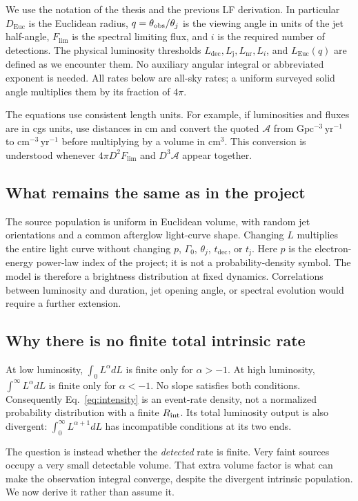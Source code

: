 \documentclass[11pt,a4paper]{article}
\newcommand{\Euc}{\mathrm{Euc}}
\newcommand{\Flim}{F_{\mathrm{lim}}}
\newcommand{\Ldec}{L_{\mathrm{dec}}}
\newcommand{\Lj}{L_{\mathrm j}}
\newcommand{\Lnr}{L_{\mathrm{nr}}}
\newcommand{\tdec}{t_{\mathrm{dec}}}
\newcommand{\tj}{t_{\mathrm j}}
\begin{document}
We use the notation of the thesis and the previous LF derivation. In
particular $D_\Euc$ is the Euclidean radius, $q=\theta_{\rm obs}/\theta_j$
is the viewing angle in units of the jet half-angle, $\Flim$ is the spectral
limiting flux, and $i$ is the required number of detections. The physical
luminosity thresholds $\Ldec,\Lj,\Lnr,L_i$, and $L_\Euc(q)$ are defined as
we encounter them. No auxiliary angular integral or abbreviated exponent is
needed. All rates below are all-sky rates; a uniform surveyed solid angle
multiplies them by its fraction of $4\pi$.

The equations use consistent length units. For example, if luminosities and
fluxes are in cgs units, use distances in cm and convert the quoted
$\mathcal A$ from $\mathrm{Gpc^{-3}\,yr^{-1}}$ to
$\mathrm{cm^{-3}\,yr^{-1}}$ before multiplying by a volume in $\mathrm{cm^3}$.
This conversion is understood whenever $4\pi D^2\Flim$ and $D^3\mathcal A$
appear together.

\subsection{What remains the same as in the project}
The source population is uniform in Euclidean volume, with random jet
orientations and a common afterglow light-curve shape. Changing $L$ multiplies
the entire light curve without changing $p$, $\Gamma_0$, $\theta_j$,
$\tdec$, or $\tj$. Here $p$ is the electron-energy power-law index of the
project; it is not a probability-density symbol. The model is therefore a
brightness distribution at fixed dynamics. Correlations between luminosity
and duration, jet opening angle, or spectral evolution would require a further
extension.

\subsection{Why there is no finite total intrinsic rate}
At low luminosity, $\int_0 L^\alpha dL$ is finite only for $\alpha>-1$.
At high luminosity, $\int^\infty L^\alpha dL$ is finite only for
$\alpha<-1$. No slope satisfies both conditions. Consequently
Eq.~\eqref{eq:intensity} is an event-rate density, not a normalized probability
distribution with a finite $R_{\rm int}$. Its total luminosity output is also
divergent: $\int_0^\infty L^{\alpha+1}dL$ has incompatible conditions at its
two ends.

The question is instead whether the \emph{detected} rate is finite. Very faint
sources occupy a very small detectable volume. That extra volume factor is
what can make the observation integral converge, despite the divergent
intrinsic population. We now derive it rather than assume it.
\end{document}
